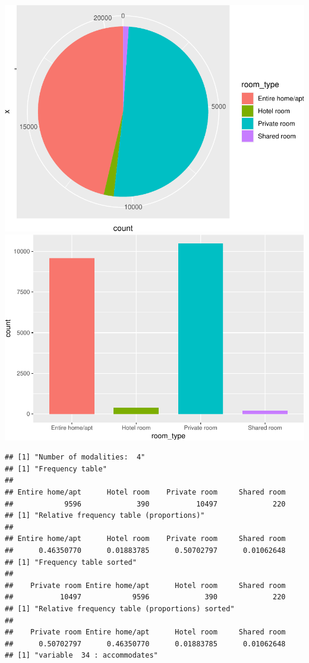 \includegraphics{anal_files/figure-latex/unnamed-chunk-9-14.pdf}
\includegraphics{anal_files/figure-latex/unnamed-chunk-9-15.pdf}

\begin{verbatim}
## [1] "Number of modalities:  4"
## [1] "Frequency table"
## 
## Entire home/apt      Hotel room    Private room     Shared room 
##            9596             390           10497             220 
## [1] "Relative frequency table (proportions)"
## 
## Entire home/apt      Hotel room    Private room     Shared room 
##      0.46350770      0.01883785      0.50702797      0.01062648 
## [1] "Frequency table sorted"
## 
##    Private room Entire home/apt      Hotel room     Shared room 
##           10497            9596             390             220 
## [1] "Relative frequency table (proportions) sorted"
## 
##    Private room Entire home/apt      Hotel room     Shared room 
##      0.50702797      0.46350770      0.01883785      0.01062648 
## [1] "variable  34 : accommodates"
\end{verbatim}

